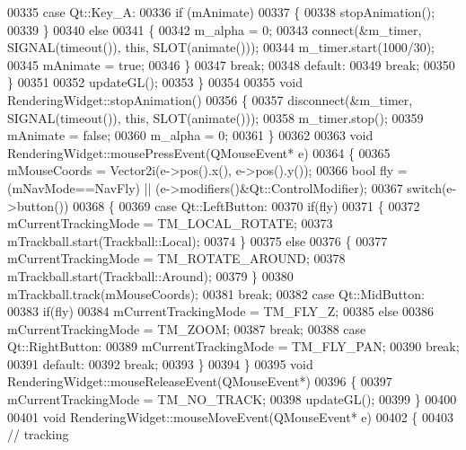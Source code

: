 \begin{DoxyCode}
00335       \textcolor{keywordflow}{case} Qt::Key\_A:
00336         \textcolor{keywordflow}{if} (mAnimate)
00337         \{
00338           stopAnimation();
00339         \}
00340         \textcolor{keywordflow}{else}
00341         \{
00342           m\_alpha = 0;
00343           connect(&m\_timer, SIGNAL(timeout()), \textcolor{keyword}{this}, SLOT(animate()));
00344           m\_timer.start(1000/30);
00345           mAnimate = \textcolor{keyword}{true};
00346         \}
00347         \textcolor{keywordflow}{break};
00348       \textcolor{keywordflow}{default}:
00349         \textcolor{keywordflow}{break};
00350     \}
00351 
00352     updateGL();
00353 \}
00354 
00355 \textcolor{keywordtype}{void} RenderingWidget::stopAnimation()
00356 \{
00357   disconnect(&m\_timer, SIGNAL(timeout()), \textcolor{keyword}{this}, SLOT(animate()));
00358   m\_timer.stop();
00359   mAnimate = \textcolor{keyword}{false};
00360   m\_alpha = 0;
00361 \}
00362 
00363 \textcolor{keywordtype}{void} RenderingWidget::mousePressEvent(QMouseEvent* e)
00364 \{
00365   mMouseCoords = Vector2i(e->pos().x(), e->pos().y());
00366   \textcolor{keywordtype}{bool} fly = (mNavMode==NavFly) || (e->modifiers()&Qt::ControlModifier);
00367   \textcolor{keywordflow}{switch}(e->button())
00368   \{
00369     \textcolor{keywordflow}{case} Qt::LeftButton:
00370       \textcolor{keywordflow}{if}(fly)
00371       \{
00372         mCurrentTrackingMode = TM\_LOCAL\_ROTATE;
00373         mTrackball.start(Trackball::Local);
00374       \}
00375       \textcolor{keywordflow}{else}
00376       \{
00377         mCurrentTrackingMode = TM\_ROTATE\_AROUND;
00378         mTrackball.start(Trackball::Around);
00379       \}
00380       mTrackball.track(mMouseCoords);
00381       \textcolor{keywordflow}{break};
00382     \textcolor{keywordflow}{case} Qt::MidButton:
00383       \textcolor{keywordflow}{if}(fly)
00384         mCurrentTrackingMode = TM\_FLY\_Z;
00385       \textcolor{keywordflow}{else}
00386         mCurrentTrackingMode = TM\_ZOOM;
00387       \textcolor{keywordflow}{break};
00388     \textcolor{keywordflow}{case} Qt::RightButton:
00389         mCurrentTrackingMode = TM\_FLY\_PAN;
00390       \textcolor{keywordflow}{break};
00391     \textcolor{keywordflow}{default}:
00392       \textcolor{keywordflow}{break};
00393   \}
00394 \}
00395 \textcolor{keywordtype}{void} RenderingWidget::mouseReleaseEvent(QMouseEvent*)
00396 \{
00397     mCurrentTrackingMode = TM\_NO\_TRACK;
00398     updateGL();
00399 \}
00400 
00401 \textcolor{keywordtype}{void} RenderingWidget::mouseMoveEvent(QMouseEvent* e)
00402 \{
00403     \textcolor{comment}{// tracking}

\end{DoxyCode}
